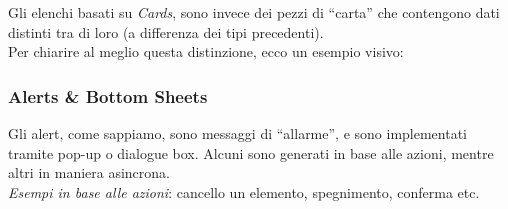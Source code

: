 \documentclass[oneside]{book}
\begin{document}
				Gli elenchi basati su \emph{Cards}, sono invece dei pezzi di ``carta'' che contengono dati distinti tra di loro (a differenza dei tipi precedenti). \\

				Per chiarire al meglio questa distinzione, ecco un esempio visivo:
				\begin{figure}[htbp]
				\centering%
				\qquad\qquad 
				\end{figure} 

			\newpage
			\subsubsection{Alerts \& Bottom Sheets} \label{BottomSheetAlertAndroid}
				Gli alert, come sappiamo, sono messaggi di ``allarme'', e sono implementati tramite pop-up o dialogue box. Alcuni sono generati in base alle azioni, mentre altri in maniera asincrona. \\
				\emph{Esempi in base alle azioni}: cancello un elemento, spegnimento, conferma etc. \\
\end{document}
